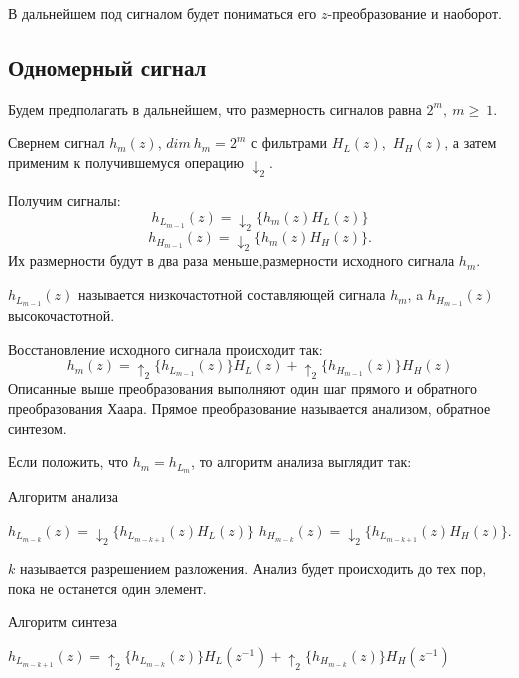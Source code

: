\documentclass[oneside, final, 14pt]{article}
\begin{document}
В дальнейшем под сигналом будет пониматься его $z$-преобразование и наоборот.
\subsection{Одномерный сигнал}
Будем предполагать в дальнейшем, что размерность сигналов равна $2^m,~m \geq~1$.

Свернем сигнал $h_m(z)$, $dim~h_m = 2^m$ с фильтрами $H_L(z)$,~$H_H(z)$, а затем применим к получившемуся операцию $\downarrow_2$.

Получим сигналы: $$h_{L_{m-1}}(z) = \downarrow_2 \{h_m(z)H_L(z)\}$$ $$h_{H_{m-1}}(z) = \downarrow_2 \{h_m(z)H_H(z)\}.$$ Их размерности будут в два раза меньше,размерности исходного сигнала $h_m$.

$h_{L_{m-1}}(z)$ называется низкочастотной составляющей сигнала $h_m$, a $h_{H_{m-1}}(z)$ высокочастотной. 

Восстановление исходного сигнала происходит так:
$$h_m(z) = \uparrow_2 \{ h_{L_{m-1}}(z) \} H_L(z) + \uparrow_2 \{ h_{H_{m-1}}(z) \} H_H(z)	$$
Описанные выше преобразования выполняют один шаг прямого и обратного преобразования Хаара. Прямое преобразование называется анализом, обратное синтезом.

Если положить, что $h_m = h_{L_m}$, то алгоритм анализа выглядит так:
\begin{algorithm}
\caption{Алгоритм анализа}
\begin{algorithmic}
	\State $h_{L_{m-k}}(z) = \downarrow_2 \{h_{L_{m-k+1}}(z)H_L(z)\}$
	\State $h_{H_{m-k}}(z) = \downarrow_2 \{h_{L_{m-k+1}}(z)H_H(z)\}.$
	\EndFor
\end{algorithmic}
\end{algorithm}


$k$ называется разрешением разложения. Анализ будет происходить до тех пор, пока не останется один элемент.
\begin{algorithm}[H]
\caption{Алгоритм синтеза}
\begin{algorithmic}
		\State$h_{L_{m-k + 1}}(z) = \uparrow_2 \{ h_{L_{m-k}}(z) \} H_L(z^{-1}) + \uparrow_2 \{ h_{H_{m-k}}(z) \} H_H(z^{-1})$
	\EndFor
\end{algorithmic}
\end{algorithm}	
\end{document}

